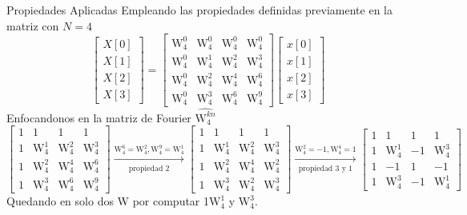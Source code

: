 \documentclass[aspectratio=169]{beamer}
\begin{document}
\begin{frame}{Propiedades Aplicadas}
    Empleando las propiedades definidas previamente en la matriz con $N = 4$
    $$
\begin{bmatrix}
X[0] \\
X[1] \\
X[2] \\
X[3]
\end{bmatrix}
=
\begin{bmatrix}       
\text{W}_4^{0} & \text{W}_4^{0} & \text{W}_4^{0} & \text{W}_4^{0} \\
\text{W}_4^{0} & \text{W}_4^{1} & \text{W}_4^{2} & \text{W}_4^{3} \\
\text{W}_4^{0} & \text{W}_4^{2} & \text{W}_4^{4} & \text{W}_4^{6} \\
\text{W}_4^{0} & \text{W}_4^{3} & \text{W}_4^{6} & \text{W}_4^{9}
\end{bmatrix}
\begin{bmatrix}
x[0] \\
x[1] \\
x[2] \\
x[3]
\end{bmatrix}
$$
Enfocandonos en la matriz de Fourier $\widehat{\text{W}^{kn}_4}$
$$
\begin{bmatrix}       
1 & 1 & 1 & 1 \\
1 & \text{W}_4^{1} & \text{W}_4^{2} & \text{W}_4^{3} \\
1 & \text{W}_4^{2} & \text{W}_4^{4} & \text{W}_4^{6} \\
1 & \text{W}_4^{3} & \text{W}_4^{6} & \text{W}_4^{9}
\end{bmatrix}
\xrightarrow[\text{propiedad 2}]{\text{W}^{6}_4=\text{W}^2_4, \text{W}^{9}_4=\text{W}^1_4}
\begin{bmatrix}       
1 & 1 & 1 & 1 \\
1 & \text{W}_4^{1} & \text{W}_4^{2} & \text{W}_4^{3} \\
1 & \text{W}_4^{2} & \text{W}_4^{4} & \text{W}_4^{2} \\
1 & \text{W}_4^{3} & \text{W}_4^{2} & \text{W}_4^{3}
\end{bmatrix}
\xrightarrow[\text{propiedad 3 y 1}]{\text{W}^{2}_4=-1, \text{W}^{4}_4=1}
\begin{bmatrix}       
1 & 1 & 1 & 1 \\
1 & \text{W}_4^{1} & -1 & \text{W}_4^{3} \\
1 & -1 & 1 & -1 \\
1 & \text{W}_4^{3} & -1 & \text{W}_4^{1}
\end{bmatrix}
$$
Quedando en solo dos W por computar 1$\text{W}_4^1$ y $\text{W}_4^3$.

\end{frame}
\end{document}
